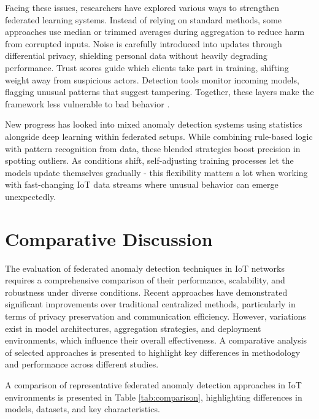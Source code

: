 \documentclass[12pt]{article}
\begin{document}
Facing these issues, researchers have explored various ways to strengthen federated learning systems. Instead of relying on standard methods, some approaches use median or trimmed averages during aggregation to reduce harm from corrupted inputs. Noise is carefully introduced into updates through differential privacy, shielding personal data without heavily degrading performance. Trust scores guide which clients take part in training, shifting weight away from suspicious actors. Detection tools monitor incoming models, flagging unusual patterns that suggest tampering. Together, these layers make the framework less vulnerable to bad behavior \cite{paper11,paper12}.

New progress has looked into mixed anomaly detection systems using statistics alongside deep learning within federated setups. While combining rule-based logic with pattern recognition from data, these blended strategies boost precision in spotting outliers. As conditions shift, self-adjusting training processes let the models update themselves gradually - this flexibility matters a lot when working with fast-changing IoT data streams where unusual behavior can emerge unexpectedly.


	\section{Comparative Discussion}
	
The evaluation of federated anomaly detection techniques in IoT networks requires a comprehensive comparison of their performance, scalability, and robustness under diverse conditions. Recent approaches have demonstrated significant improvements over traditional centralized methods, particularly in terms of privacy preservation and communication efficiency. However, variations exist in model architectures, aggregation strategies, and deployment environments, which influence their overall effectiveness. A comparative analysis of selected approaches is presented to highlight key differences in methodology and performance across different studies.

A comparison of representative federated anomaly detection approaches in IoT environments is presented in Table \ref{tab:comparison}, highlighting differences in models, datasets, and key characteristics.
\end{document}
